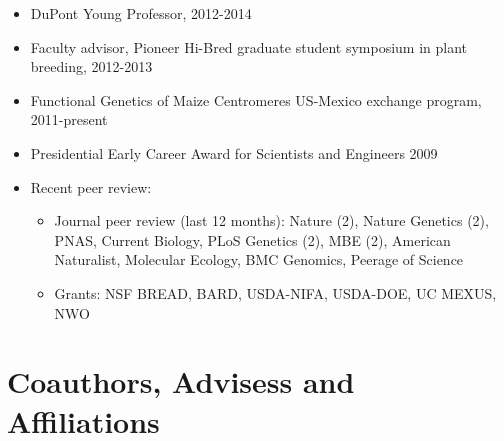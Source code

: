 \documentclass[11pt]{article}
\newcommand{\ignore}[1]{}
\begin{document}
\begin{itemize} \setlength{\itemsep}{0pt} \setlength{\parskip}{2pt} \setlength{\parsep}{0pt}

\item DuPont Young Professor, 2012-2014

\item Faculty advisor, Pioneer Hi-Bred graduate student symposium in plant breeding, 2012-2013


\item Functional Genetics of Maize Centromeres US-Mexico exchange program, 2011-present

\item Presidential Early Career Award for Scientists and Engineers 2009

\item Recent peer review: 
\begin{itemize} 
\item Journal peer review (last 12 months): \ignore{8/13,10/13} Nature (2), \ignore {1/14, 3/14} Nature Genetics (2), \ignore{6/13,7/13,8/13} PNAS, \ignore{8/13} Current Biology, \ignore{3/13,4/14,4/14} PLoS Genetics (2), \ignore{7/14,7/14} MBE (2), \ignore {3/14} American Naturalist, \ignore{1/14} Molecular Ecology, \ignore{1/14} BMC Genomics, \ignore{9/13} Peerage of Science
\item Grants: NSF BREAD, BARD, USDA-NIFA, USDA-DOE, UC MEXUS, NWO
\end{itemize}
\end{itemize}


\section{Coauthors, Advisess and Affiliations}
\end{document}
